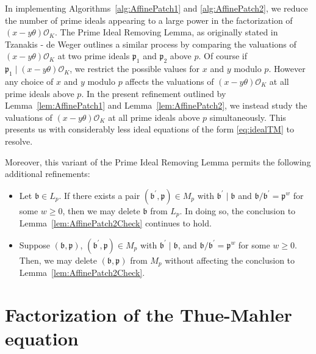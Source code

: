 \documentclass[11pt]{report}
\theoremstyle{definition}
\begin{document}
In implementing Algorithms~\ref{alg:AffinePatch1} and \ref{alg:AffinePatch2}, we reduce the number of prime ideals appearing to a large power in the factorization of $(x-y\theta)\mathcal{O}_K$. The Prime Ideal Removing Lemma, as originally stated in Tzanakis - de Weger outlines a similar process by comparing the valuations of $(x-y\theta)\mathcal{O}_K$ at two prime ideals $\mathfrak{p}_1$ and $\mathfrak{p}_2$ above $p$. Of course if $\mathfrak{p}_1 \mid (x-y\theta)\mathcal{O}_K$, we restrict the possible values for $x$ and $y$ modulo $p$. However any choice of $x$ and $y$ modulo $p$ affects the valuations of $(x-y\theta)\mathcal{O}_K$ at all prime ideals above $p$. In the present refinement outlined by Lemma~\ref{lem:AffinePatch1} and Lemma~\ref{lem:AffinePatch2}, we instead study the valuations of $(x-y\theta)\mathcal{O}_K$ at all prime ideals above $p$ simultaneously. This presents us with considerably less ideal equations of the form \eqref{eq:idealTM} to resolve.

Moreover, this variant of the Prime Ideal Removing Lemma permits the following additional refinements:
\begin{itemize}
\item Let $\mathfrak{b} \in L_p$. If there exists a pair $(\mathfrak{b}^\prime,\mathfrak{p}) \in M_p$ with $\mathfrak{b}^\prime \mid \mathfrak{b}$ and $\mathfrak{b}/\mathfrak{b}^\prime=\mathfrak{p}^w$
for some $w \ge 0$, then we may delete $\mathfrak{b}$ from $L_p$. In doing so, the conclusion to Lemma~\ref{lem:AffinePatch2Check} continues to hold.
\item Suppose $(\mathfrak{b},\mathfrak{p})$, $(\mathfrak{b}^\prime,\mathfrak{p}) \in M_p$ with $\mathfrak{b}^{\prime} \mid \mathfrak{b}$, and $\mathfrak{b}/\mathfrak{b}^{\prime}=\mathfrak{p}^w$ for some ${w \geq 0}$. Then, we may delete $(\mathfrak{b},\mathfrak{p})$ from $M_p$ without affecting the conclusion to Lemma~\ref{lem:AffinePatch2Check}.
\end{itemize}


\section{Factorization of the Thue-Mahler equation}
\label{sec:FactorizationTM}
\end{document}
